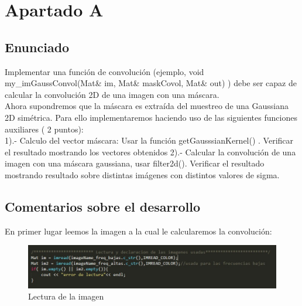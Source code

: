 \newpage %

\tableofcontents %

\listoffigures

\newpage




\section{Apartado A}

\subsection{Enunciado}
Implementar una función de convolución (ejemplo, void my\_imGaussConvol(Mat\& im, Mat\& maskCovol, Mat\& out) ) debe ser capaz de calcular la convolución 2D de una imagen con una máscara.\\
Ahora supondremos que la máscara es extraída del muestreo de una Gaussiana 2D simétrica. Para ello implementaremos haciendo uso de las siguientes funciones auxiliares ( 2 puntos):\\


1).- Calculo del vector máscara: Usar la función getGausssianKernel() . Verificar el resultado mostrando los vectores obtenidos
2).- Calcular la convolución de una imagen con una máscara gaussiana, usar filter2d(). Verificar el resultado mostrando resultado sobre distintas imágenes con distintos valores de sigma.
\subsection{Comentarios sobre el desarrollo}

En primer lugar leemos la imagen a la cual le calcularemos la convolución:

\begin{figure}[h]
\centering
\includegraphics[width=0.7\linewidth]{lecturaimagen}
\caption{Lectura de la imagen}
\label{fig:lecturaimagen}
\end{figure}

